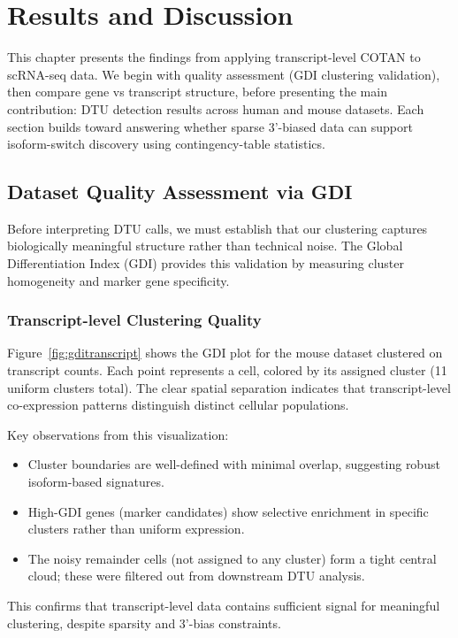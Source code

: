 \chapter{Results and Discussion}

This chapter presents the findings from applying transcript-level COTAN to scRNA-seq data. We begin with quality assessment (GDI clustering validation), then compare gene vs transcript structure, before presenting the main contribution: DTU detection results across human and mouse datasets. Each section builds toward answering whether sparse 3'-biased data can support isoform-switch discovery using contingency-table statistics.

\section{Dataset Quality Assessment via GDI}

Before interpreting DTU calls, we must establish that our clustering captures biologically meaningful structure rather than technical noise. The Global Differentiation Index (GDI) provides this validation by measuring cluster homogeneity and marker gene specificity.

\subsection*{Transcript-level Clustering Quality}\label{sec:gdi-transcript}

Figure~\ref{fig:gditranscript} shows the GDI plot for the mouse dataset clustered on transcript counts. Each point represents a cell, colored by its assigned cluster (11 uniform clusters total). The clear spatial separation indicates that transcript-level co-expression patterns distinguish distinct cellular populations.

Key observations from this visualization:
\begin{itemize}
    \item Cluster boundaries are well-defined with minimal overlap, suggesting robust isoform-based signatures.
    \item High-GDI genes (marker candidates) show selective enrichment in specific clusters rather than uniform expression.
    \item The noisy remainder cells (not assigned to any cluster) form a tight central cloud; these were filtered out from downstream DTU analysis.
\end{itemize}


This confirms that transcript-level data contains sufficient signal for meaningful clustering, despite sparsity and 3'-bias constraints.

